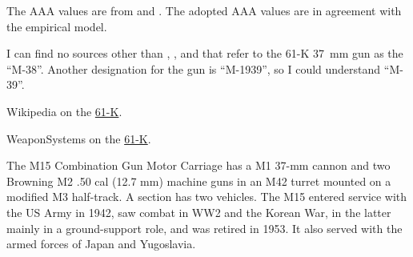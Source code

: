 \begin{withcounters}
{        

        

        The AAA values are from {\AirStr} and {\TSOH}.
        The adopted AAA values are in agreement with the empirical model.

        I can find no sources other than {\AirStr}, {\EOTG}, and {\TSOH} that refer to the 61-K 37~mm gun as the “M-38”. Another designation for the gun is “M-1939”, so I could understand “M-39”.

        \begin{notesources}
            \item Wikipedia on the \href{https://en.wikipedia.org/wiki/37_mm_automatic_air_defense_gun_M1939_(61-K)}{61-K}.
            \item WeaponSystems on the \href{https://weaponsystems.net/system/950-M1939}{61-K}.
        \end{notesources}
    }


    The M15 Combination Gun Motor Carriage has a M1 37-mm cannon and two Browning M2 .50 cal (12.7 mm) machine guns in an M42 turret mounted on a modified M3 half-track.
    A section has two vehicles.
    The M15 entered service with the US Army in 1942, saw combat in WW2 and the Korean War, in the latter mainly in a ground-support role, and was retired in 1953. It also served with the armed forces of Japan and Yugoslavia.%


\end{withcounters}
